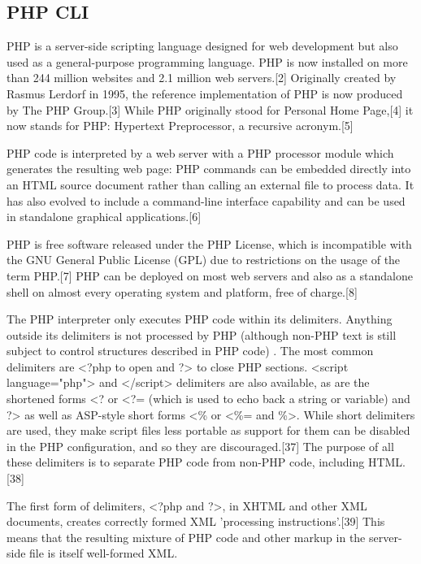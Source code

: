 \newpage
\subsection{PHP CLI}

PHP is a server-side scripting language designed for web development but also used as a general-purpose programming language. PHP is now installed on more than 244 million websites and 2.1 million web servers.[2] Originally created by Rasmus Lerdorf in 1995, the reference implementation of PHP is now produced by The PHP Group.[3] While PHP originally stood for Personal Home Page,[4] it now stands for PHP: Hypertext Preprocessor, a recursive acronym.[5]

\vpara
PHP code is interpreted by a web server with a PHP processor module which generates the resulting web page: PHP commands can be embedded directly into an HTML source document rather than calling an external file to process data. It has also evolved to include a command-line interface capability and can be used in standalone graphical applications.[6]

\vpara
PHP is free software released under the PHP License, which is incompatible with the GNU General Public License (GPL) due to restrictions on the usage of the term PHP.[7] PHP can be deployed on most web servers and also as a standalone shell on almost every operating system and platform, free of charge.[8]

\vpara
The PHP interpreter only executes PHP code within its delimiters. Anything outside its delimiters is not processed by PHP (although non-PHP text is still subject to control structures described in PHP code) . The most common delimiters are <?php to open and ?> to close PHP sections. <script language="php"> and </script> delimiters are also available, as are the shortened forms <? or <?= (which is used to echo back a string or variable) and ?> as well as ASP-style short forms <\% or <\%= and \%>. While short delimiters are used, they make script files less portable as support for them can be disabled in the PHP configuration, and so they are discouraged.[37] The purpose of all these delimiters is to separate PHP code from non-PHP code, including HTML.[38]

\vpara
The first form of delimiters, <?php and ?>, in XHTML and other XML documents, creates correctly formed XML 'processing instructions'.[39] This means that the resulting mixture of PHP code and other markup in the server-side file is itself well-formed XML.

